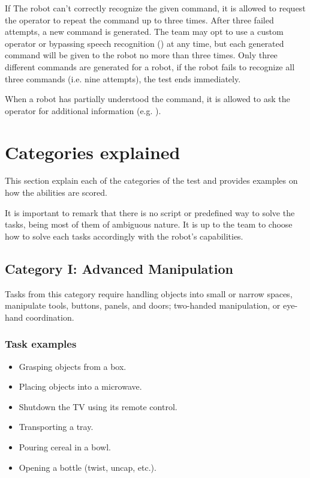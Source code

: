 If The robot can't correctly recognize the given command, it is allowed to request the operator to repeat the command up to three times. After three failed attempts, a new command is generated. The team may opt to use a custom operator or bypassing speech recognition () at any time, but each generated command will be given to the robot no more than three times. Only three different commands are generated for a robot, if the robot fails to recognize all three commands (i.e. nine attempts), the test ends immediately.

When a robot has partially understood the command, it is allowed to ask the operator for additional information (e.g. \textit{}).

%
%
\section{Categories explained}
\label{sec:eegpsr-categories-explained}
This section explain each of the categories of the test and provides examples on how the abilities are scored.

It is important to remark that there is no script or predefined way to solve the tasks, being most of them of ambiguous nature. It is up to the team to choose how to solve each tasks accordingly with the robot's capabilities.


%
%
\subsection{Category I: Advanced Manipulation}
\label{sec:eegpsr-category1-explained}
Tasks from this category require handling objects into small or narrow spaces, manipulate tools, buttons, panels, and doors; two-handed manipulation, or eye-hand coordination. 

\subsubsection{Task examples}
\begin{itemize}
	\item Grasping objects from a box.
	\item Placing objects into a microwave.
	\item Shutdown the TV using its remote control.
	\item Transporting a tray.
	\item Pouring cereal in a bowl.
	\item Opening a bottle (twist, uncap, etc.).
\end{itemize}

